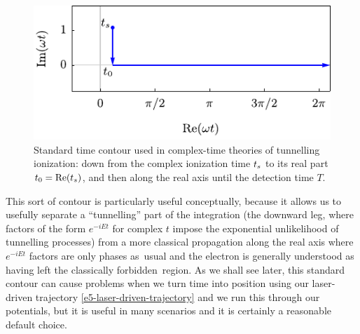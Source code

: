\begin{figure}[htb]
\centering
\includegraphics[scale=1]{5-Quantum-orbits/Figures/figure5B.pdf}
\caption[Standard integration path in the complex time plane, from the ionization time $t_s$ to its real part and then along the real axis]{Standard time contour used in complex-time theories of tunnelling ionization: down from the complex ionization time ${t_s}$ to its real part ${t_0}=\Re({t_s})$, and then along the real axis until the detection time $T$.}
\label{f5-standard-time-contour}
\end{figure}


This sort of contour is particularly useful conceptually, because it allows us to usefully separate a ``tunnelling'' part of the integration (the downward leg, where factors of the form $e^{-iEt}$ for complex $t$ impose the exponential unlikelihood of tunnelling processes) from a more classical propagation along the real axis where $e^{-iEt}$ factors are only phases as~usual and the electron is generally understood as having left the classically forbidden~region. As we shall see later, this standard contour can cause problems when we turn time into position using our laser-driven trajectory \eqref{e5-laser-driven-trajectory} and we run this through our potentials, but it is useful in many scenarios and it is certainly a reasonable default choice.


